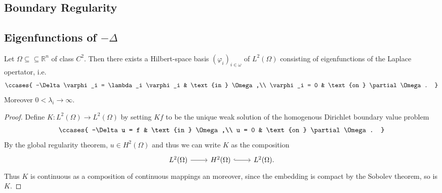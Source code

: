 \subsection*{Boundary Regularity}

\subsection*{Eigenfunctions of $-\Delta$}

\begin{theorem}
	Let $\Omega \subseteq \subseteq \mathbb{R}^n$ of class $C^2$. Then there exists a Hilbert-space basis $(\varphi_i)_{i \in \omega}$ of $L^2(\Omega)$ consisting of eigenfunctions of the Laplace opertator, i.e. 
	\begin{align*}
		\ccases{
			-\Delta \varphi_i = \lambda_i \varphi_i & \text{in } \Omega,\\
			\varphi_i = 0 & \text{on } \partial \Omega.
		}
	\end{align*}
	Moreover $0 < \lambda_i \to \infty$.
\end{theorem}

\begin{proof}
	Define $K : L^2(\Omega) \to L^2(\Omega)$ by setting $Kf$ to be the unique weak solution of the homogenous Dirichlet boundary value problem
	\begin{align*}
		\ccases{
			-\Delta u = f & \text{in } \Omega,\\
			u = 0 & \text{on } \partial \Omega.
		}
	\end{align*}
	By the global regularity theorem, $u \in H^2(\Omega)$ and thus we can write $K$ as the composition
	\begin{equation*}
		\begin{tikzcd}
			L^2(\Omega) \arrow[r] & H^2(\Omega) \arrow[r,hook] & L^2(\Omega).
		\end{tikzcd}
	\end{equation*}
	Thus $K$ is continuous as a composition of continuous mappings an moreover, since the embedding is compact by the Sobolev theorem, so is $K$.
\end{proof}
